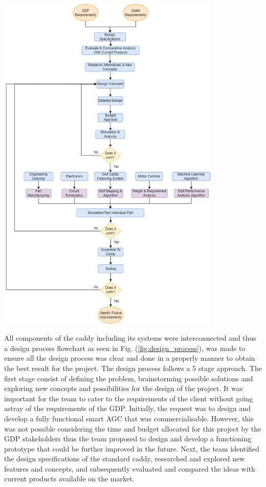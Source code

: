 \documentclass[11pt,landscape]{article}
\newenvironment{Figure}
  {\par\medskip\noindent\minipage{\linewidth}}
  {\endminipage\par\medskip}
\begin{document}
\begin{multicols}{2}
\begin{Figure} 
    \begin{center}
        \includegraphics[width=0.8\textwidth]{design_process.png}
    \end{center}
    \label{fig:design_process}
\end{Figure}


All components of the caddy including its systems were interconnected and thus a
design process flowchart as seen in Fig. (\ref{fig:design_process}), was made to
ensure all the design process was clear and done in a properly manner to obtain
the best result for the project. The design process follows a 5 stage approach.
The first stage consist of defining the problem, brainstorming possible solutions
and exploring new concepts and possibilities for the design of the project. It was
important for the team to cater to the requirements of the client without going
astray of the requirements of the GDP. Initially, the request was to design and
develop a fully functional smart AGC that was commercialisable. However, this
was not possible considering the time and budget allocated for this project by
the GDP stakeholders thus the team proposed to design and develop a functioning
prototype that could be further improved in the future. Next, the team identified
the design specifications of the standard caddy, researched and explored new
features and concepts, and subsequently evaluated and compared the ideas with
current products available on the market. 


\end{multicols}
\end{document}
